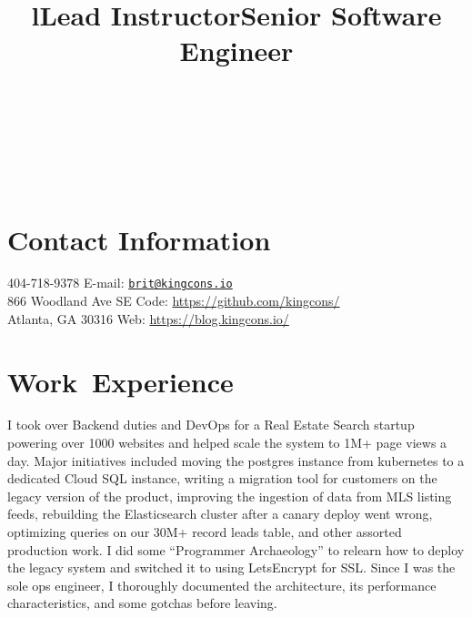 \documentclass[margintitle,line]{res}
\begin{document}

\begin{resume}

\begin{format}
\\
\title{l}\\
\body\\
\end{format}



\section{Contact Information}

404-718-9378 \hfill {E-mail:} \href{mailto:brit@kingcons.io}{\nolinkurl{brit@kingcons.io}} \\
866 Woodland Ave SE \hfill {Code:} \url{https://github.com/kingcons/} \\
Atlanta, GA 30316 \hfill {Web:} \url{https://blog.kingcons.io/} \\


\section{\mbox{Work Experience}}

\title{Lead Instructor}
\begin{position}

\end{position}

\title{Senior Software Engineer}
\begin{position}
  I took over Backend duties and DevOps for a Real Estate Search startup powering over 1000
  websites and helped scale the system to 1M+ page views a day. Major initiatives included moving
  the postgres instance from kubernetes to a dedicated Cloud SQL instance, writing a migration
  tool for customers on the legacy version of the product, improving the ingestion of data from
  MLS listing feeds, rebuilding the Elasticsearch cluster after a canary deploy went wrong,
  optimizing queries on our 30M+ record leads table, and other assorted production work.
  I did some ``Programmer Archaeology'' to relearn how to deploy the legacy system
  and switched it to using LetsEncrypt for SSL. Since I was the sole ops engineer, I thoroughly
  documented the architecture, its performance characteristics, and some gotchas before leaving.
\end{position}


\end{resume}
\end{document}
